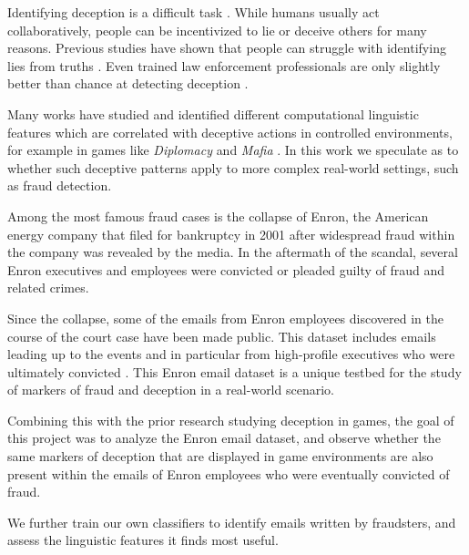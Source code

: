 Identifying deception is a difficult task \cite{mafia}. While humans usually act collaboratively, people can be incentivized to lie or deceive others for many reasons. %
Previous studies have shown that people can struggle with identifying lies from truths \cite{mafia}. Even trained law enforcement professionals are only slightly better than chance at detecting deception \cite{enron_deception_gupta}.

Many works have studied and identified different computational linguistic features which are correlated with deceptive actions in controlled environments, for example in games like \textit{Diplomacy} \cite{diplomacy} and \textit{Mafia} \cite{mafia}. In this work we speculate as to whether such deceptive patterns apply to more complex real-world settings, such as fraud detection.

Among the most famous fraud cases is the collapse of Enron, the American energy company that filed for bankruptcy in 2001 after widespread fraud within the company was revealed by the media. In the aftermath of the scandal, several Enron executives and employees were convicted or pleaded guilty of fraud and related crimes.

Since the collapse, some of the emails from Enron employees discovered in the course of the court case have been made public. This dataset includes emails leading up to the events and in particular from high-profile executives who were ultimately convicted \cite{enron_dataset}. This Enron email dataset is a unique testbed for the study of markers of fraud and deception in a real-world scenario.

Combining this with the prior research studying deception in games, the goal of this project was to analyze the Enron email dataset, and observe whether the same markers of deception that are displayed in game environments are also present within the emails of Enron employees who were eventually convicted of fraud.

We further train our own classifiers to identify emails written by fraudsters, and assess the linguistic features it finds most useful. 

%
%
%







